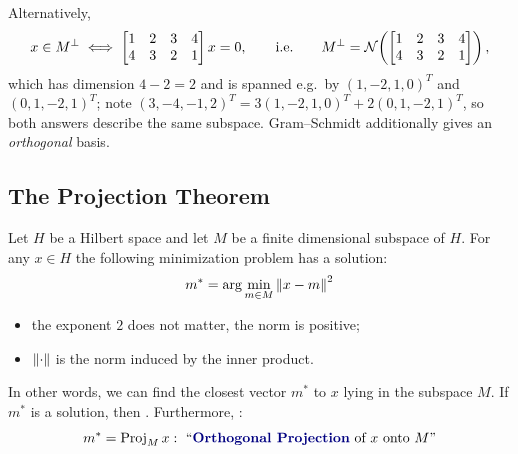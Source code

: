 \begin{example}
\begin{insight}[Verification]
Alternatively,
\[
x\in M^\perp\iff\begin{bmatrix}1&2&3&4\\4&3&2&1\end{bmatrix}x=0, \qquad\text{i.e.}\qquad M^\perp=\mathcal{N}\!\left(\begin{bmatrix}1&2&3&4\\4&3&2&1\end{bmatrix}\right),
\]
which has dimension $4-2=2$ and is spanned e.g.\ by $(1,-2,1,0)^T$ and $(0,1,-2,1)^T$; note $(3,-4,-1,2)^T=3(1,-2,1,0)^T+2(0,1,-2,1)^T$, so both answers describe the same subspace. Gram--Schmidt additionally gives an \emph{orthogonal} basis.
\end{insight}
\end{example}

\subsection{The Projection Theorem}\label{ss:projection-thm}
\begin{theorem}
Let $H$ be a Hilbert space and let $M$ be a finite dimensional subspace of $H$.
For any $x\in H$ the following minimization problem has a solution:
\[
m^* = \arg\min_{m\in M} \left\lVert x-m \right\rVert^{2}
\]
\begin{itemize}[nosep]
  \item the exponent $2$ does not matter, the norm is positive;
  \item $\left\lVert \cdot \right\rVert$ is the norm induced by the inner product.
\end{itemize}
In other words, we can find the closest vector $m^*$ to $x$ lying in the subspace $M$.
If $m^*$ is a solution, then .
Furthermore, :
\[
m^* = \operatorname{Proj}_M x : \text{ ``\term{Orthogonal Projection} of $x$ onto $M$''}
\]
\end{theorem}

